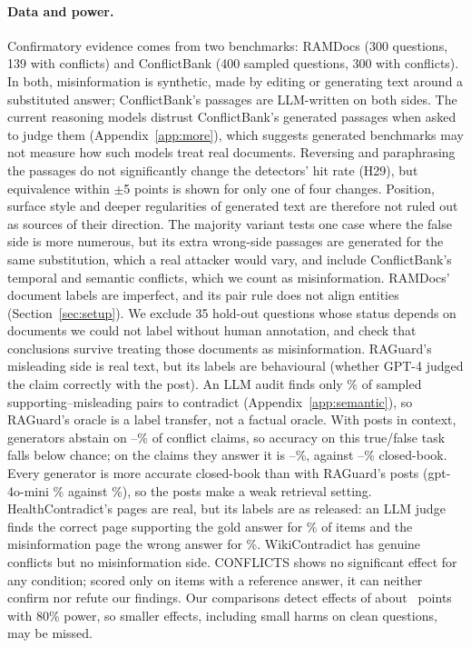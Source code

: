 \paragraph{Data and power.} Confirmatory evidence comes from two benchmarks: RAMDocs (300 questions, 139
with conflicts) and ConflictBank (400 sampled questions, 300 with conflicts). In both, misinformation is
synthetic, made by editing or generating text around a substituted answer; ConflictBank's passages are LLM-written
on both sides. The current reasoning models distrust ConflictBank's generated passages when asked to judge them
(Appendix~\ref{app:more}), which suggests generated benchmarks may not measure how such models treat real
documents. Reversing and paraphrasing the passages do not significantly change the detectors' hit rate (H29), but
equivalence within $\pm$5 points is shown for only one of four changes. Position, surface style and deeper regularities of generated text are therefore
not ruled out as sources of their direction. The majority variant tests one
case where the false side is more numerous, but its extra wrong-side passages are generated for the same substitution,
which a real attacker would vary, and include ConflictBank's temporal and semantic conflicts, which we count as
misinformation. RAMDocs' document labels are imperfect, and its pair rule does not align entities
(Section~\ref{sec:setup}). We exclude 35 hold-out questions whose status depends on
documents we could not label without human annotation, and check that conclusions survive treating those
documents as misinformation. RAGuard's misleading side is real text, but its labels are behavioural (whether GPT-4
judged the claim correctly with the post). An LLM audit finds only \rgAudContradict\% of sampled supporting--misleading
pairs to contradict (Appendix~\ref{app:semantic}), so RAGuard's oracle is a label transfer, not a factual oracle. With
posts in context, generators abstain on \rgAbstMin--\rgAbstMax\% of conflict claims, so accuracy on this
true/false task falls below chance; on the claims they answer it is \rgAnsMin--\rgAnsMax\%, against
\rgCbMin--\rgCbMax\% closed-book. Every generator is more accurate closed-book than with RAGuard's posts
(gpt-4o-mini \zcRgMiniConflict\% against \zpRgMiniConflict\%), so the posts make a weak retrieval setting.
HealthContradict's pages are real, but its labels are as released: an LLM judge finds the correct page supporting
the gold answer for \hcLabCorrect\% of items and the misinformation page the wrong answer for \hcLabMis\%.
WikiContradict has genuine conflicts but no misinformation side. CONFLICTS shows no significant effect for any
condition; scored only on items with a reference answer, it can neither confirm nor refute our findings. Our
comparisons detect effects of about \mdeMed\ points with 80\% power, so smaller effects, including small harms on clean
questions, may be missed.

